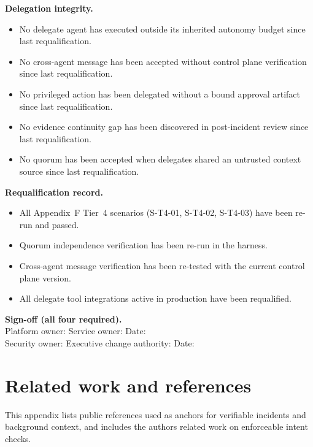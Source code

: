 \documentclass[11pt]{article}
\begin{document}
\textbf{Delegation integrity.}
\begin{itemize}
  \item No delegate agent has executed outside its inherited autonomy budget since last requalification.
  \item No cross-agent message has been accepted without control plane verification since last requalification.
  \item No privileged action has been delegated without a bound approval artifact since last requalification.
  \item No evidence continuity gap has been discovered in post-incident review since last requalification.
  \item No quorum has been accepted when delegates shared an untrusted context source since last requalification.
\end{itemize}

\textbf{Requalification record.}
\begin{itemize}
  \item All Appendix~F Tier~4 scenarios (S-T4-01, S-T4-02, S-T4-03) have been re-run and passed.
  \item Quorum independence verification has been re-run in the harness.
  \item Cross-agent message verification has been re-tested with the current control plane version.
  \item All delegate tool integrations active in production have been requalified.
\end{itemize}

\textbf{Sign-off (all four required).}\\
Platform owner: \underline{\hspace{1.5in}} \quad Service owner: \underline{\hspace{1.5in}} \quad Date: \underline{\hspace{0.7in}}\\[0.4em]
Security owner: \underline{\hspace{1.5in}} \quad Executive change authority: \underline{\hspace{1.5in}} \quad Date: \underline{\hspace{0.7in}}

\section{Related work and references}

This appendix lists public references used as anchors for verifiable incidents and background context, and includes the author\textquotesingle s related work on enforceable intent checks.
\end{document}

